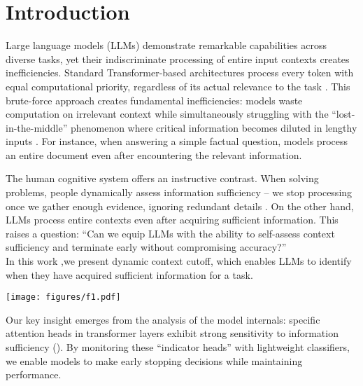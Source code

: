 \vspace{-1em}
\section{Introduction}  
Large language models (LLMs) demonstrate remarkable capabilities across diverse tasks, yet their indiscriminate processing of entire input contexts creates inefficiencies. Standard Transformer-based architectures process every token with equal computational priority, regardless of its actual relevance to the task \citep{vaswani2017attention}. This brute-force approach creates fundamental inefficiencies: models waste computation on irrelevant context while simultaneously struggling with the ``lost-in-the-middle'' phenomenon where critical information becomes diluted in lengthy inputs \citep{lostinmiddle, RULER}. For instance, when answering a simple factual question, models process an entire document even after encountering the relevant information.


\noindent\begin{minipage}[t]{0.48\textwidth}
The human cognitive system offers an instructive contrast. When solving problems, people dynamically assess information sufficiency – we stop processing once we gather enough evidence, ignoring redundant details \citep{fiske1991social}. On the other hand, LLMs process entire contexts even after acquiring sufficient information. This raises a question: ``Can we equip LLMs with the ability to self-assess context sufficiency and terminate early without compromising accuracy?''
\\
In this work ,we present dynamic context cutoff, which enables LLMs to identify when they have acquired sufficient information for a task. 
\end{minipage}
\hfill
\begin{minipage}[t]{0.48\textwidth}
\centering
\vspace{-5mm}
\texttt{[image: figures/f1.pdf]}
\vspace{-6mm}
\label{fig:f1}
\end{minipage}


Our key insight emerges from the analysis of the model internals: specific attention heads in transformer layers exhibit strong sensitivity to information sufficiency (). By monitoring these ``indicator heads'' with lightweight classifiers, we enable models to make early stopping decisions while maintaining performance. 


